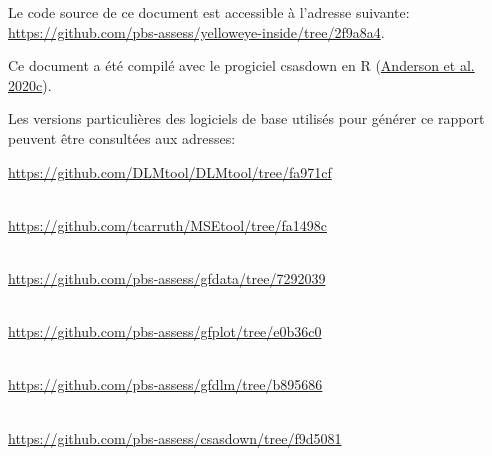\documentclass[french,11pt]{book}
\begin{document}
\vspace{4mm}

Le code source de ce document est accessible à l'adresse suivante:\\
\url{https://github.com/pbs-assess/yelloweye-inside/tree/2f9a8a4}.

Ce document a été compilé avec le progiciel csasdown en R (\protect\hyperlink{ref-csasdown}{Anderson et al. 2020c}).

Les versions particulières des logiciels de base utilisés pour générer ce rapport peuvent être consultées aux adresses:

\url{https://github.com/DLMtool/DLMtool/tree/fa971cf}\strut \\
\url{https://github.com/tcarruth/MSEtool/tree/fa1498c}\strut \\
\url{https://github.com/pbs-assess/gfdata/tree/7292039}\strut \\
\url{https://github.com/pbs-assess/gfplot/tree/e0b36c0}\strut \\
\url{https://github.com/pbs-assess/gfdlm/tree/b895686}\strut \\
\url{https://github.com/pbs-assess/csasdown/tree/f9d5081}\strut \\

\clearpage
\end{document}
